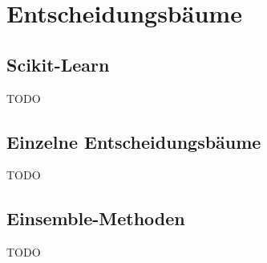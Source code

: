 \chapter{Entscheidungsbäume}

\section{Scikit-Learn}
TODO

\section{Einzelne Entscheidungsbäume}
TODO

\section{Einsemble-Methoden}
TODO